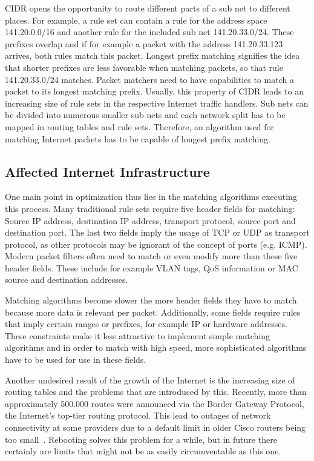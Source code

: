 \documentclass[a4paper,
		12pt,
		parskip=full,
		titlepage
		]{scrartcl}
\begin{document}
CIDR opens the opportunity to route different parts of a sub net to different places.
For example, a rule set can contain a rule for the address space 141.20.0.0/16 and another rule for the included sub net 141.20.33.0/24.
These prefixes overlap and if for example a packet with the address 141.20.33.123 arrives, both rules match this packet.
Longest prefix matching signifies the idea that shorter prefixes are less favorable when matching packets, so that rule 141.20.33.0/24 matches.
Packet matchers need to have capabilities to match a packet to its longest matching prefix.
Usually, this property of CIDR leads to an increasing size of rule sets in the respective Internet traffic handlers. %
Sub nets can be divided into numerous smaller sub nets and each network split has to be mapped in routing tables and rule sets.
Therefore, an algorithm used for matching Internet packets has to be capable of longest prefix matching.

\subsection{Affected Internet Infrastructure}
One main point in optimization thus lies in the matching algorithms executing this process.
Many traditional rule sets require five header fields for matching: Source 
IP address, destination IP address, transport protocol, source port and destination port.
The last two fields imply the usage of TCP or UDP as transport protocol, 
as other protocols may be ignorant of the concept of ports (e.g. ICMP).
Modern packet filters often need to match or even modify more than these five header fields.
These include for example VLAN tags, QoS information or MAC source and destination addresses.

Matching algorithms become slower the more header fields they have to match because more data is relevant per packet.
Additionally, some fields require rules that imply certain ranges or prefixes, for example IP or hardware addresses.
These constraints make it less attractive to implement simple matching algorithms and in order to match with high speed, more sophisticated
algorithms have to be used for use in these fields.

Another undesired result of the growth of the Internet is the increasing size of routing tables and the problems that are introduced by this.
Recently, more than approximately 500.000 routes were announced via the Border Gateway Protocol, the Internet's top-tier routing protocol.
This lead to outages of network connectivity at some providers due to a default limit in older Cisco routers being too small~\cite{outage}.
Rebooting solves this problem for a while, but in future there certainly are limits that might not be as easily circumventable as this one.
\end{document}
